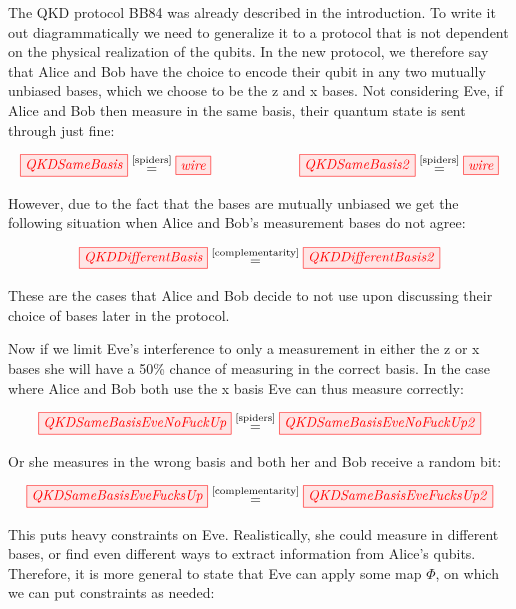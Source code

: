 \documentclass[]{article}
\newcommand{\equaltext}[1]{\ensuremath{\stackrel{\text{#1}}{=}}}
\begin{document}
The QKD protocol BB84 was already described in the introduction. To write it out diagrammatically we need to generalize it to a protocol that is not dependent on the physical realization of the qubits. In the new protocol, we therefore say that Alice and Bob have the choice to encode their qubit in any two mutually unbiased bases, which we choose to be the z and x bases. Not considering Eve, if Alice and Bob then measure in the same basis, their quantum state is sent through just fine:

\begin{equation}
	\tikzfig{QKDSameBasis} \equaltext{\ref{spiders}} \tikzfig{wire} ~~~~~~~~~~~~~~~~~~~ \tikzfig{QKDSameBasis2} \equaltext{\ref{spiders}} \tikzfig{wire}
\end{equation}

However, due to the fact that the bases are mutually unbiased we get the following situation when Alice and Bob's measurement bases do not agree:

\begin{equation}
\tikzfig{QKDDifferentBasis} \equaltext{\ref{complementarity}} \tikzfig{QKDDifferentBasis2}
\end{equation}

These are the cases that Alice and Bob decide to not use upon discussing their choice of bases later in the protocol.

Now if we limit Eve's interference to only a measurement in either the z or x bases she will have a 50\% chance of measuring in the correct basis. In the case where Alice and Bob both use the x basis Eve can thus measure correctly:

\begin{equation}
	\tikzfig{QKDSameBasisEveNoFuckUp} \equaltext{\ref{spiders}} \tikzfig{QKDSameBasisEveNoFuckUp2} 
\end{equation}

Or she measures in the wrong basis and both her and Bob receive a random bit:

\begin{equation}
	\tikzfig{QKDSameBasisEveFucksUp} \equaltext{\ref{complementarity}} \tikzfig{QKDSameBasisEveFucksUp2}
\end{equation}

This puts heavy constraints on Eve. Realistically, she could measure in different bases, or find even different ways to extract information from Alice's qubits. Therefore, it is more general to state that Eve can apply some map $\Phi$, on which we can put constraints as needed:
\end{document}
